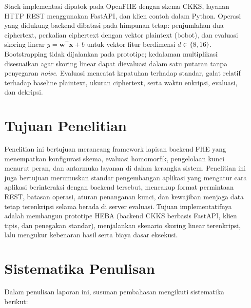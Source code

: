 \documentclass[12pt,a4paper,oneside]{report}
\begin{document}
Stack implementasi dipatok pada OpenFHE dengan skema CKKS, layanan HTTP REST menggunakan FastAPI, dan klien contoh dalam Python. Operasi yang didukung backend dibatasi pada himpunan tetap: penjumlahan dua ciphertext, perkalian ciphertext dengan vektor plaintext (bobot), dan evaluasi skoring linear $y=\mathbf{w}^{\top}\mathbf{x}+b$ untuk vektor fitur berdimensi $d\in\{8,16\}$. Bootstrapping tidak dijalankan pada prototipe; kedalaman multiplikasi disesuaikan agar skoring linear dapat dievaluasi dalam satu putaran tanpa penyegaran \emph{noise}. Evaluasi mencatat kepatuhan terhadap standar, galat relatif terhadap baseline plaintext, ukuran ciphertext, serta waktu enkripsi, evaluasi, dan dekripsi.

\section{Tujuan Penelitian}

Penelitian ini bertujuan merancang framework lapisan backend FHE yang menempatkan konfigurasi skema, evaluasi homomorfik, pengelolaan kunci menurut peran, dan antarmuka layanan di dalam kerangka sistem. Penelitian ini juga bertujuan merumuskan standar pengembangan aplikasi yang mengatur cara aplikasi berinteraksi dengan backend tersebut, mencakup format permintaan REST, batasan operasi, aturan penanganan kunci, dan kewajiban menjaga data tetap terenkripsi selama berada di server evaluasi. Tujuan implementatifnya adalah membangun prototipe HEBA (backend CKKS berbasis FastAPI, klien tipis, dan penegakan standar), menjalankan skenario skoring linear terenkripsi, lalu mengukur kebenaran hasil serta biaya dasar eksekusi.

\section{Sistematika Penulisan}

Dalam penulisan laporan ini, susunan pembahasan mengikuti sistematika berikut:
\end{document}
